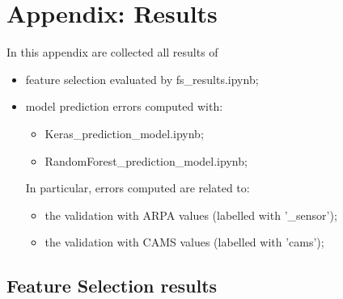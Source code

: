 \chapter{Appendix: Results}
\label{chap:appendix}
In this appendix are collected all results of
\begin{itemize}
    \item feature selection evaluated by fs\_results.ipynb;
    \item model prediction errors computed with:
    \begin{itemize}
        \item Keras\_prediction\_model.ipynb;
        \item RandomForest\_prediction\_model.ipynb;
    \end{itemize} 
    In particular, errors computed are related to:
    \begin{itemize}
        \item the validation with ARPA values (labelled with '\_sensor');
        \item the validation with CAMS values (labelled with '\-cams');
    \end{itemize}
\end{itemize}
\section{Feature Selection results}
